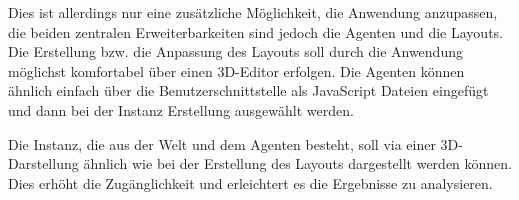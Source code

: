 Dies ist allerdings nur eine zusätzliche Möglichkeit, die Anwendung anzupassen, die beiden zentralen Erweiterbarkeiten sind jedoch die Agenten und die Layouts.
Die Erstellung bzw. die Anpassung des Layouts soll durch die Anwendung möglichst komfortabel über einen 3D-Editor erfolgen.
Die Agenten können ähnlich einfach über die Benutzerschnittstelle als JavaScript Dateien eingefügt und dann bei der Instanz Erstellung ausgewählt werden.

Die Instanz, die aus der Welt und dem Agenten besteht, soll via einer 3D-Darstellung ähnlich wie bei der Erstellung des Layouts dargestellt werden können.
Dies erhöht die Zugänglichkeit und erleichtert es die Ergebnisse zu analysieren.
